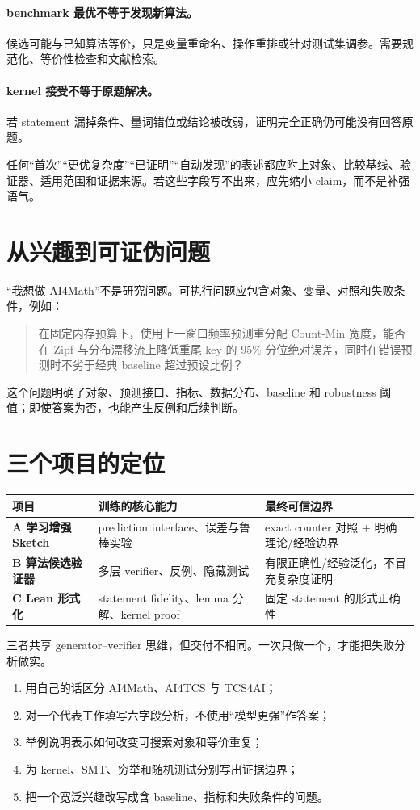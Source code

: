 \paragraph{benchmark 最优不等于发现新算法。}
候选可能与已知算法等价，只是变量重命名、操作重排或针对测试集调参。需要规范化、等价性检查和文献检索。

\paragraph{kernel 接受不等于原题解决。}
若 statement 漏掉条件、量词错位或结论被改弱，证明完全正确仍可能没有回答原题。

\begin{warningbox}
任何“首次”“更优复杂度”“已证明”“自动发现”的表述都应附上对象、比较基线、验证器、适用范围和证据来源。若这些字段写不出来，应先缩小 claim，而不是补强语气。
\end{warningbox}

\section{从兴趣到可证伪问题}

“我想做 AI4Math”不是研究问题。可执行问题应包含对象、变量、对照和失败条件，例如：
\begin{quote}
在固定内存预算下，使用上一窗口频率预测重分配 Count-Min 宽度，能否在 Zipf 与分布漂移流上降低重尾 key 的 $95\%$ 分位绝对误差，同时在错误预测时不劣于经典 baseline 超过预设比例？
\end{quote}
这个问题明确了对象、预测接口、指标、数据分布、baseline 和 robustness 阈值；即使答案为否，也能产生反例和后续判断。

\section{三个项目的定位}

\begin{center}
\begin{tabularx}{0.96\textwidth}{>{\bfseries}lX X}
\toprule
项目 & 训练的核心能力 & 最终可信边界 \\
\midrule
A 学习增强 Sketch & prediction interface、误差与鲁棒实验 & exact counter 对照 + 明确理论/经验边界 \\
B 算法候选验证器 & 多层 verifier、反例、隐藏测试 & 有限正确性/经验泛化，不冒充复杂度证明 \\
C Lean 形式化 & statement fidelity、lemma 分解、kernel proof & 固定 statement 的形式正确性 \\
\bottomrule
\end{tabularx}
\end{center}
三者共享 generator--verifier 思维，但交付不相同。一次只做一个，才能把失败分析做实。

\begin{checkpointbox}
\begin{enumerate}
  \item 用自己的话区分 AI4Math、AI4TCS 与 TCS4AI；
  \item 对一个代表工作填写六字段分析，不使用“模型更强”作答案；
  \item 举例说明表示如何改变可搜索对象和等价重复；
  \item 为 kernel、SMT、穷举和随机测试分别写出证据边界；
  \item 把一个宽泛兴趣改写成含 baseline、指标和失败条件的问题。
\end{enumerate}
\end{checkpointbox}
